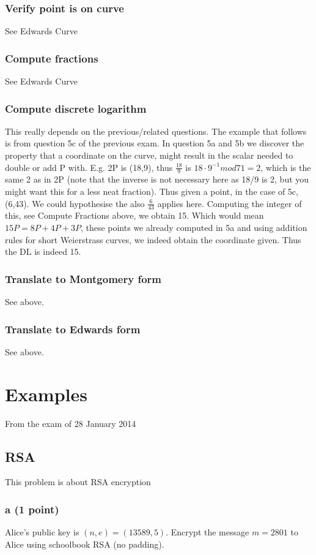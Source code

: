 \documentclass{article}
\begin{document}
\subsubsection{Verify point is on curve}
See Edwards Curve
\subsubsection{Compute fractions}
See Edwards Curve
\subsubsection{Compute discrete logarithm}
This really depends on the previous/related questions. The example that follows is from question 5c of the previous exam.
In question 5a and 5b we discover the property that a coordinate on the curve,
might result in the scalar needed to double or add P with. E.g. 2P is (18,9),
thus $\frac{18}{9}$ is $18 \cdot 9^{-1} mod 71 = 2$, which is the same 2 as in 2P (note that the inverse is not necessary here as 18/9 is 2, but you might want this for a less neat fraction).
Thus given a point, in the case of 5c, (6,43). We could hypothesise the also $\frac{6}{43}$ applies here. Computing the integer of this, see Compute Fractions above, we obtain 15. Which would mean $15P = 8P + 4P + 3P$, these points we already computed in 5a and using addition rules for short Weierstrass curves, we indeed obtain the coordinate given. Thus the DL is indeed 15.
\subsubsection{Translate to Montgomery form}
See above.
\subsubsection{Translate to Edwards form}
See above.


\section{Examples}
From the exam of 28 January 2014
\subsection{RSA}
This problem is about RSA encryption

\subsubsection{a (1 point)}
Alice's public key is $(n, e) = (13589, 5)$. Encrypt the
message $m = 2801$ to Alice using schoolbook RSA (no padding).
\end{document}
